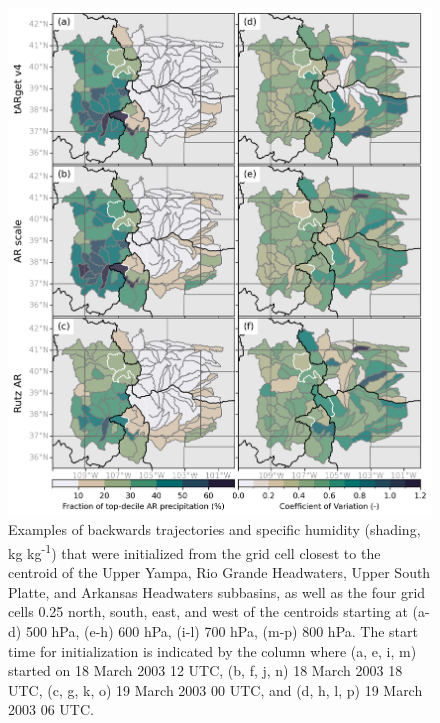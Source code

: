 \documentclass[draft]{agujournal2019}
\begin{document}
\begin{figure}
\noindent\includegraphics[width=\textwidth, height=\textheight, keepaspectratio]{fig3.png}
\caption{Examples of backwards trajectories and specific humidity (shading, kg kg\textsuperscript{-1}) that were initialized from the grid cell closest to the centroid of the Upper Yampa, Rio Grande Headwaters, Upper South Platte, and Arkansas Headwaters subbasins, as well as the four grid cells 0.25\textdegree{} north, south, east, and west of the centroids starting at (a-d) 500 hPa, (e-h) 600 hPa, (i-l) 700 hPa, (m-p) 800 hPa. The start time for initialization is indicated by the column where (a, e, i, m) started on 18 March 2003 12 UTC, (b, f, j, n) 18 March 2003 18 UTC, (c, g, k, o) 19 March 2003 00 UTC, and (d, h, l, p) 19 March 2003 06 UTC.}
\label{fig:sensitivity_tests}
\end{figure}
\end{document}
